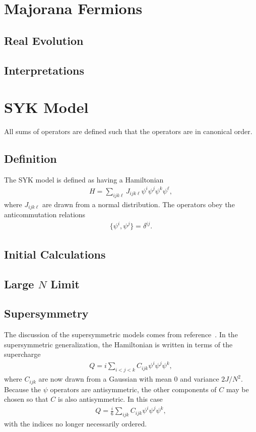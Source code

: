 \documentclass[12pt]{article} %
\renewcommand{\l}{\ell}
\begin{document}
\section{Majorana Fermions}

\subsection{Real Evolution}

\subsection{Interpretations}

\section{SYK Model}

All sums of operators are defined such that the operators are in canonical order.

\subsection{Definition} \emph{}

The SYK model is defined as having a Hamiltonian
\begin{align}
H = \sum_{ijk\l}J_{ijk\l}\psi^i\psi^j\psi^k\psi^\l,
\end{align}
where $J_{ijk\l}$ are drawn from a normal distribution. The operators obey the anticommutation relations
\begin{align}
\{\psi^i,\psi^j\} = \delta^{ij}.
\end{align}

\subsection{Initial Calculations}

\subsection{Large $N$ Limit}

\subsection{Supersymmetry}\emph{}

The discussion of the supersymmetric models comes from reference~\cite{fu16}. In the supersymmetric generalization, the Hamiltonian is written in terms of the supercharge
\begin{align}
Q = i\sum_{i<j<k}C_{ijk}\psi^i\psi^j\psi^k,
\end{align}
where $C_{ijk}$ are now drawn from a Gaussian with mean 0 and variance $2J/N^2$. Because the $\psi$ operators are antisymmetric, the other components of $C$ may be chosen so that $C$ is also antisymmetric. In this case 
\begin{align}
Q = \frac{i}{6}\sum_{ijk}C_{ijk}\psi^i\psi^j\psi^k,
\end{align}
with the indices no longer necessarily ordered.
\end{document}
